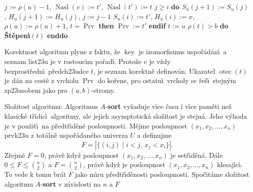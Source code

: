 \documentclass[a4paper,12pt]{article}
\DeclareMathOperator*{\otec}{otec}
\DeclareMathOperator*{\Prv}{Prv}
\DeclareMathOperator*{\Nasl}{Nasl}
\DeclareMathOperator*{\key}{key}
\begin{document}
\phantom{---------}$j:=\rho (u)-1$, $\Nasl(v):=t'$, $\Nasl(t'):=t$\newline 
\phantom{---------}{\bf while} $j\ge i$ {\bf do\newline 
\phantom{------------}$S_u(j+1):=S_u(j)$}, $H_u(j+1):=H_u(j)$, $j:=j-1$\newline 
\phantom{---------}{\bf enddo}\newline 
\phantom{---------}$S_u(i):=t'$, $H_u(i):=x$, $\rho (u):=\rho (u)+1$,\newline 
\phantom{---------}{\bf if} $t=\Prv$ {\bf then} $\Prv:=t'$ {\bf endif}\newline 
\phantom{------}{\bf endif}\newline 
\phantom{------}$t:=u$\newline 
\phantom{------}{\bf while} $\rho (t)>b$ {\bf do \v St\v epen\'\i$(t)$ enddo}\newline 
\phantom{---}{\bf endif\newline 
endif}
\medskip

\flushpar Korektnost algoritmu plyne z faktu, \v ze $\key$ je 
izomorfismus uspo\-\v r\'a\-d\'an\'\i\ a seznam list\accent23u je v 
rostouc\'\i m po\v rad\'\i . Proto\v ze $v$ je v\v zdy bez\-prost\-\v redn\'\i\ 
p\v redch\accent23udce $t$, je seznam korektn\v e definov\'an. 
U\-ka\-zatel $\otec(t)$ je d\'an na cest\v e z vrcholu $\Prv$ do 
ko\v rene, pro ostatn\'\i\ vrcholy se \v re\v s\'\i\ stejn\'ym 
zp\accent23usobem jako pro $(a,b)$-stromy.
\medskip

\flushpar Slo\v zitost algoritmu: Algoritmus $A$-{\bf sort} vy\v zaduje v\'\i ce 
\v casu i v\'\i ce pam\v eti ne\v z klasick\'e t\v r\'\i dic\'\i\ algoritmy, ale jejich 
asymptotick\'a slo\v zitost je stejn\'a. Jeho v\'yhoda je v pou\v zit\'\i\ 
na p\v red\-t\v r\'\i\-d\v en\'e posloupnosti. M\v ejme posloupnost $
(x_1,x_2,\dots,x_n)$ 
prvk\accent23u z to\-t\'aln\v e uspo\v r\'adan\'eho univerza $U$ a definujme 
$$F=|\{(i,j)\mid i<j,\,x_j<x_i\}|.$$
Z\v rejm\v e $F=0$, pr\'av\v e kdy\v z posloupnost 
$(x_1,x_2,\dots,x_n)$ je set\v r\'\i\-d\v en\'a. D\'ale $0\le F\le\binom 
n2$ a $F=\binom n2$, pr\'av\v e 
kdy\v z je posloupnost $(x_1,x_2,\dots,x_n)$ klesaj\'\i c\'\i . To vede k tomu 
br\'at $F$ jako m\'\i ru p\v redt\v r\'\i d\v enosti posloupnosti. Spo\v c\'\i t\'ame 
slo\v zitost algoritmu $A$-{\bf sort} v z\'avislosti na $n$ a $F$
\medskip
\end{document}
